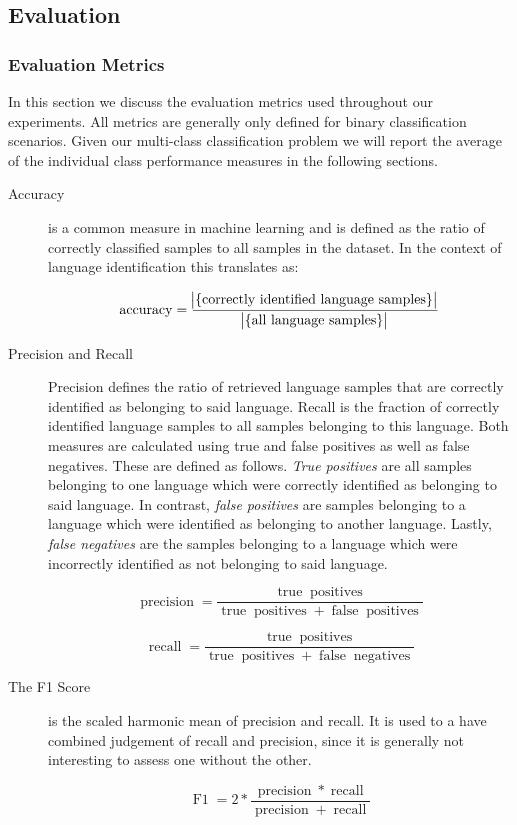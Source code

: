 \subsection{Evaluation} 

\subsubsection{Evaluation Metrics} 
\label{sec:metrics}
In this section we discuss the evaluation metrics used throughout our experiments. All metrics are generally only defined for binary classification scenarios. Given our multi-class classification problem we will report the average of the individual class performance measures in the following sections. 

\begin{description}
    \item[Accuracy] is a common measure in machine learning and is defined as the ratio of correctly classified samples to all samples in the dataset. In the context of language identification this translates as:
     
    	$$
		\operatorname{accuracy} = \frac{
			\abs{ \{ \text{correctly identified language samples} \} }
			}{
			\abs{ \{ \text{all language samples} \} }
			}
		$$
     
    
    \item[Precision and Recall] Precision defines the ratio of retrieved language samples that are correctly identified as belonging to said language. Recall is the fraction of correctly identified language samples to all samples belonging to this language. Both measures are calculated using true and false positives as well as false negatives. These are defined as follows. \textit{True positives} are all samples belonging to one language which were correctly identified as belonging to said language. In contrast, \textit{false positives} are samples belonging to a language which were identified as belonging to another language. Lastly, \textit{false negatives} are the samples belonging to a language which were incorrectly identified as not belonging to said language.

	    $$
	    \operatorname{precision} = \frac
	      {\operatorname{true} \operatorname{positives}}
	      {\operatorname{true} \operatorname{positives} + \operatorname{false} \operatorname{positives}}
	    $$
		
		$$
		\operatorname{recall} = \frac
			{\operatorname{true} \operatorname{positives}}
			{\operatorname{true} \operatorname{positives} + \operatorname{false} \operatorname{negatives}}
		$$    


    \item[The F1 Score] is the scaled harmonic mean of precision and recall. It is used to a have combined judgement of recall and precision, since it is generally not interesting to assess one without the other.
    
    	$$
    	\operatorname{F1} = 2 * \frac{\operatorname{precision} * \operatorname{recall}}{\operatorname{precision} + \operatorname{recall}}
    	$$

\end{description}

